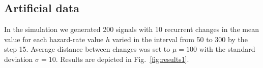 \subsection{Artificial data}
In the simulation we generated 200 signals with 10 recurrent changes in the mean value for each hazard-rate value $h$ varied in the interval from 50 to 300 by the step 15.
Average distance between changes was set to $\mu = 100$ with the standard deviation $\sigma = 10$.
Results are depicted in Fig.~\ref{fig:results1}.
\begin{figure}[!htb]
    \begin{minipage}{0.5\textwidth}
        \centering
        \fbox{\includegraphics[
}
\end{minipage}
\end{figure}
